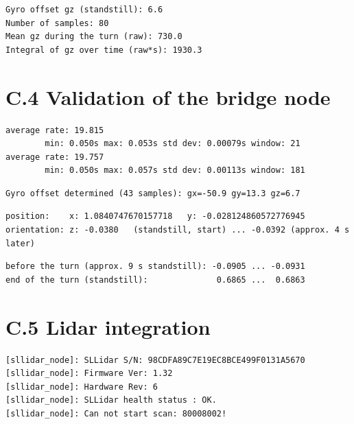 \begin{lstlisting}[numbers=none, caption={Gyroscope offset and turn test (commanded 1.5\,rad/s for 3\,s, estimated rotation approx.\ 120\textdegree).}, label={lst:gyro}]
Gyro offset gz (standstill): 6.6
Number of samples: 80
Mean gz during the turn (raw): 730.0
Integral of gz over time (raw*s): 1930.3
\end{lstlisting}

\section*{C.4 Validation of the bridge node}

\begin{lstlisting}[numbers=none, caption={Publication rate of /odom (excerpt of ros2 topic hz).}, label={lst:hz}]
average rate: 19.815
        min: 0.050s max: 0.053s std dev: 0.00079s window: 21
average rate: 19.757
        min: 0.050s max: 0.057s std dev: 0.00113s window: 181
\end{lstlisting}

\begin{lstlisting}[numbers=none, caption={Gyroscope offset determined by the bridge node at start-up.}, label={lst:nodeoffset}]
Gyro offset determined (43 samples): gx=-50.9 gy=13.3 gz=6.7
\end{lstlisting}

\begin{lstlisting}[numbers=none, caption={Pose on /odom at the end of the straight drive (scale factor 0.01\,m per unit).}, label={lst:straight}]
position:    x: 1.0840747670157718   y: -0.028124860572776945
orientation: z: -0.0380   (standstill, start) ... -0.0392 (approx. 4 s later)
\end{lstlisting}

\begin{lstlisting}[numbers=none, caption={Orientation q\_z on /odom during the turn test (excerpt).}, label={lst:turn}]
before the turn (approx. 9 s standstill): -0.0905 ... -0.0931
end of the turn (standstill):              0.6865 ...  0.6863
\end{lstlisting}

\section*{C.5 Lidar integration}

\begin{lstlisting}[numbers=none, caption={First start of the lidar driver (USB current limit active).}, label={lst:lidarerror}]
[sllidar_node]: SLLidar S/N: 98CDFA89C7E19EC8BCE499F0131A5670
[sllidar_node]: Firmware Ver: 1.32
[sllidar_node]: Hardware Rev: 6
[sllidar_node]: SLLidar health status : OK.
[sllidar_node]: Can not start scan: 80008002!
\end{lstlisting}

